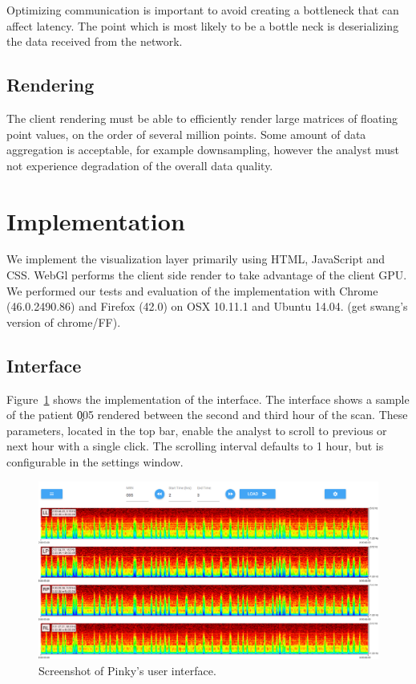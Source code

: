 Optimizing communication is important to avoid creating a bottleneck that can
affect latency. The point which is most likely to be a bottle neck is
deserializing the data received from the network.

\subsection{Rendering}

The client rendering must be able to efficiently render large matrices of
floating point values, on the order of several million points. Some amount of
data aggregation is acceptable, for example downsampling, however the  analyst
must not experience degradation of the overall data quality.

\section{Implementation}

We implement the visualization layer primarily using HTML, JavaScript and CSS.
WebGl performs the client side render to take advantage of the client GPU. We
performed our tests and evaluation of the implementation with Chrome
(46.0.2490.86) and Firefox (42.0) on OSX 10.11.1 and Ubuntu 14.04. (get swang's
version of chrome/FF).

\subsection{Interface}

Figure~\ref{fig:whole-interface} shows the implementation of the interface. The
interface shows a sample of the patient \c{005} rendered between the second and
third hour of the scan. These parameters, located in the top bar, enable the
analyst to scroll to previous or next hour with a single click. The scrolling
interval defaults to 1 hour, but is configurable in the settings window. \\

\begin{figure}[h]
\begin{center}
\includegraphics[scale=0.35]{./img/whole-interface.png}
\caption{Screenshot of Pinky's user interface.}
\label{fig:whole-interface}
\end{center}
\end{figure}

